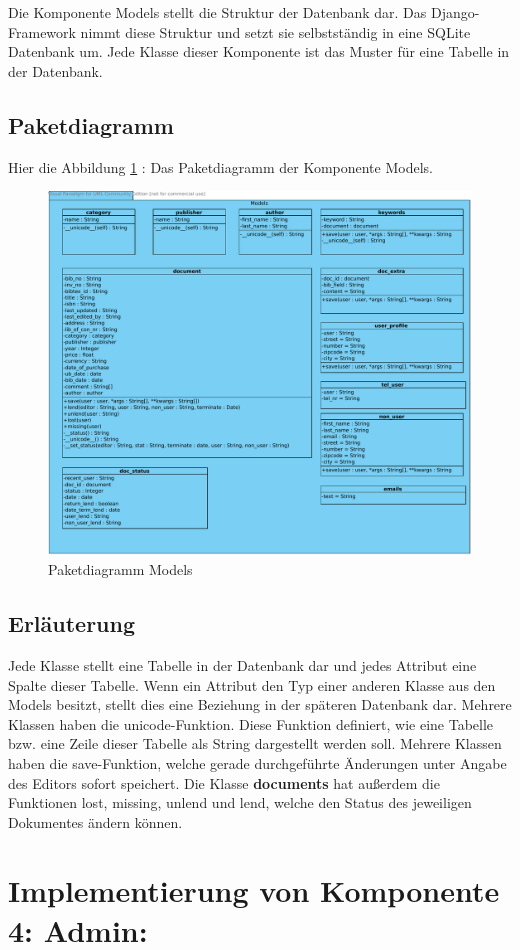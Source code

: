 Die Komponente Models stellt die Struktur der Datenbank dar. Das
Django-Framework nimmt diese Struktur und setzt sie selbstständig in eine SQLite Datenbank
um. Jede Klasse dieser Komponente ist das Muster für eine Tabelle in der
Datenbank.

\subsection{Paketdiagramm}
Hier die Abbildung \ref{fig:PDmodels} : Das Paketdiagramm der Komponente Models.
\begin{figure}[!htb]
\includegraphics[width=0.72\linewidth]{bilder/Paketdiagramm_models.pdf}
\caption{Paketdiagramm Models}
\label{fig:PDmodels}
\end{figure}
\subsection{Erl\"auterung}
Jede Klasse stellt eine Tabelle in der Datenbank dar und jedes Attribut eine
Spalte dieser Tabelle. Wenn ein Attribut den Typ einer anderen Klasse aus den
Models besitzt, stellt dies eine Beziehung in der späteren Datenbank dar.
Mehrere Klassen haben die unicode-Funktion. Diese Funktion definiert, wie eine
Tabelle bzw. eine Zeile dieser Tabelle als String dargestellt werden soll.
Mehrere Klassen haben die save-Funktion, welche gerade durchgeführte Änderungen
unter Angabe des Editors sofort speichert. Die Klasse \textbf{documents} hat außerdem
die Funktionen lost, missing, unlend und lend, welche den Status des jeweiligen
Dokumentes ändern können.

\section{Implementierung von Komponente
         4: Admin:}

